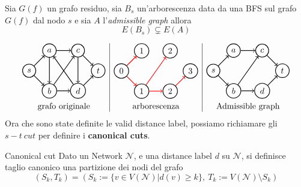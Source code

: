\documentclass[a4paper, 11pt]{report}
\newcommand*{\mc}[1]{\mathcal{#1}}
\begin{document}
\begin{obs}{}{}
    Sia $G(f)$ un grafo residuo, sia $B_s$ un'arborescenza data da una BFS sul grafo $G(f)$ dal nodo $s$ e sia $A$ l'\textit{admissible graph} allora
    \[E(B_s)\subsetneq E(A)\]
\end{obs}

\[
    \begin{array}{c|c|c}
        
    
    \begin{tikzpicture}[node distance={12mm}, thick , main/.style = {draw, circle}] 
    \node[main] (1) {$s$}; 
    \node[main] (2) [above right of=1] {$a$};
    \node[main] (3) [below right of=1] {$b$};
    \node[main] (4) [right of=2] {$c$};
    \node[main] (5) [right of=3] {$d$};
    \node[main] (6) [above right of=5] {$t$};
    \draw[->] (1) to (2);
    \draw[->] (1) to (3);
    \draw[->] (3) to (5);
    \draw[->] (2) to (4);
    \draw[->] (5) to (6);
    \draw[->] (4) to (6);
    \draw[->] (3) to (4);
    \draw[->] (4) to (5);
    \draw[->] (5) to (2);
    \draw[->] (2) to (3);
\end{tikzpicture}  &
\begin{tikzpicture}[node distance={12mm}, thick , main/.style = {draw, circle}] 
    \node[main] (1) {$0$}; 
    \node[main] (2) [above right of=1] {$1$};
    \node[main] (3) [below right of=1] {$1$};
    \node[main] (4) [right of=2] {$2$};
    \node[main] (5) [right of=3] {$2$};
    \node[main] (6) [above right of=5] {$3$};
    \draw[->, red] (1) to (2);
    \draw[->, red] (1) to (3);
    \draw[->, red] (3) to (5);
    \draw[->, red] (5) to (6);
    \draw[->, red] (3) to (4);
\end{tikzpicture} &
\begin{tikzpicture}[node distance={12mm}, thick , main/.style = {draw, circle}] 
    \node[main] (1) {$s$}; 
    \node[main] (2) [above right of=1] {$a$};
    \node[main] (3) [below right of=1] {$b$};
    \node[main] (4) [right of=2] {$c$};
    \node[main] (5) [right of=3] {$d$};
    \node[main] (6) [above right of=5] {$t$};
    \draw[->] (1) to (2);
    \draw[->] (1) to (3);
    \draw[->] (3) to (5);
    \draw[->] (5) to (6);
    \draw[->] (3) to (4);
    \draw[->] (2) to (4);
    \draw[->] (4) to (6);
\end{tikzpicture} \\
\text{grafo originale}&\text{arborescenza} & \text{Admissible graph}
\end{array} 
\]
Ora che sono state definite le valid distance label, possiamo richiamare gli $s-t\ cut$ per definire i \textbf{canonical cuts}.
\begin{definition}[label = cancut]{Canonical cut}{}
    Dato un Network $\mc{N}$, e una distance label $d$ su $\mc{N}$, si definisce taglio canonico una partizione dei nodi del grafo 
    \[(S_k, T_k) =  (S_k:=\{v\in V(\mc{N}) | d(v) \ge k\},\ T_k := V(\mc{N})\setminus S_k)\]
\end{definition}
\newpage
\end{document}

